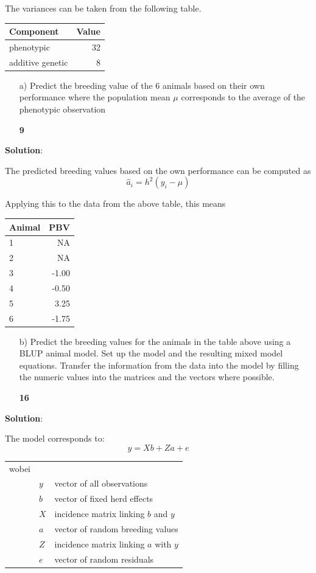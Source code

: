 \documentclass[]{article}
\newcommand{\points}[1]
{\begin{flushright}\textbf{#1}\end{flushright}}
\newcommand{\sol}
{\vspace{2ex}\textbf{Solution}:}
\begin{document}
The variances can be taken from the following table.

\begin{longtable}[]{@{}lr@{}}
\toprule
Component & Value\tabularnewline
\midrule
\endhead
phenotypic & 32\tabularnewline
additive genetic & 8\tabularnewline
\bottomrule
\end{longtable}

\begin{enumerate}
\item[a)] Predict the breeding value of the 6 animals based on their own performance where the population mean $\mu$ corresponds to the average of the phenotypic observation 
\points{9}
\end{enumerate}

\sol

The predicted breeding values based on the own performance can be
computed as \[\hat{a}_i = h^2(y_i - \mu)\]

Applying this to the data from the above table, this means

\begin{longtable}[]{@{}lr@{}}
\toprule
Animal & PBV\tabularnewline
\midrule
\endhead
1 & NA\tabularnewline
2 & NA\tabularnewline
3 & -1.00\tabularnewline
4 & -0.50\tabularnewline
5 & 3.25\tabularnewline
6 & -1.75\tabularnewline
\bottomrule
\end{longtable}

\clearpage
\pagebreak

\begin{enumerate}
\item[b)] Predict the breeding values for the animals in the table above using a BLUP animal model. Set up the model and the resulting mixed model equations. Transfer the information from the data into the model by filling the numeric values into the matrices and the vectors where possible. 
\points{16}
\end{enumerate}

\sol

The model corresponds to: \[y = Xb + Za + e\]

\begin{tabular}{lll}
wobei &  &  \\
      & $y$ & vector of all observations \\
      & $b$ & vector of fixed herd effects \\
      & $X$ & incidence matrix linking $b$ and $y$ \\
      & $a$ & vector of random breeding values  \\
      & $Z$ & incidence matrix linking $a$ with $y$ \\
      & $e$ & vector of random residuals
\end{tabular}
\end{document}
